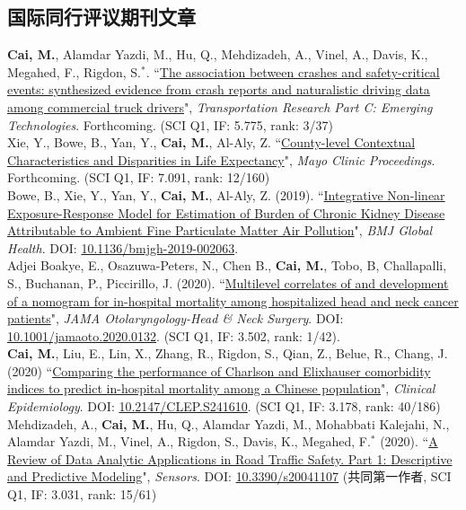 \documentclass[11pt, a4paper]{article}
\newcommand{\years}[1]{\marginnote{\scriptsize #1}}
\begin{document}
\subsection*{国际同行评议期刊文章}
\noindent
\years{2020}\textbf{Cai, M.}, Alamdar Yazdi, M., Hu, Q., Mehdizadeh, A., Vinel, A., Davis, K., Megahed, F., Rigdon, S.$^\ast$. ``\ul{The association between crashes and safety-critical events: synthesized evidence from crash reports and naturalistic driving data among commercial truck drivers}", \emph{Transportation Research Part C: Emerging Technologies}. Forthcoming. (SCI Q1, IF: 5.775, rank: 3/37)\\[6pt]
\years{2020}Xie, Y., Bowe, B., Yan, Y., \textbf{Cai, M.}, Al-Aly, Z. ``\ul{County-level Contextual Characteristics and Disparities in Life Expectancy}", \emph{Mayo Clinic Proceedings}. Forthcoming. (SCI Q1, IF: 7.091, rank: 12/160)\\[6pt]
\years{2020}Bowe, B., Xie, Y., Yan, Y., \textbf{Cai, M.}, Al-Aly, Z. (2019). ``\ul{Integrative Non-linear Exposure-Response Model for Estimation of Burden of Chronic Kidney Disease Attributable to Ambient Fine Particulate Matter Air Pollution}", \emph{BMJ Global Health}. DOI: \href{https://doi.org/10.1136/bmjgh-2019-002063}{10.1136/bmjgh-2019-002063}. \\[6pt]
\years{2020}Adjei Boakye, E., Osazuwa-Peters, N., Chen B., \textbf{Cai, M.}, Tobo, B, Challapalli, S., Buchanan, P., Piccirillo, J. (2020). ``\ul{Multilevel correlates of and development of a nomogram for in-hospital mortality among hospitalized head and neck cancer patients}", \emph{JAMA Otolaryngology-Head \& Neck Surgery}. DOI: \href{https://doi.org/10.1001/jamaoto.2020.0132}{10.1001/jamaoto.2020.0132}. (SCI Q1, IF: 3.502, rank: 1/42).\\[6pt]
\years{2020}\textbf{Cai, M.}, Liu, E., Lin, X., Zhang, R., Rigdon, S., Qian, Z., Belue, R., Chang, J. (2020) ``\ul{Comparing the performance of Charlson and Elixhauser comorbidity indices to predict in-hospital mortality among a Chinese population}", \emph{Clinical Epidemiology}. DOI: \href{https://doi.org/10.2147/CLEP.S241610}{10.2147/CLEP.S241610}. (SCI Q1, IF: 3.178, rank: 40/186)\\[6pt]
\years{2020}Mehdizadeh, A., \textbf{Cai, M.}, Hu, Q., Alamdar Yazdi, M., Mohabbati Kalejahi, N., Alamdar Yazdi, M., Vinel, A., Rigdon, S., Davis, K., Megahed, F.$^\ast$ (2020). ``\ul{A Review of Data Analytic Applications in Road Traffic Safety. Part 1: Descriptive and Predictive Modeling}", \emph{Sensors}. DOI: \href{https://doi.org/10.3390/s20041107}{10.3390/s20041107} (共同第一作者, SCI Q1, IF: 3.031, rank: 15/61)\\[6pt]
\end{document}
